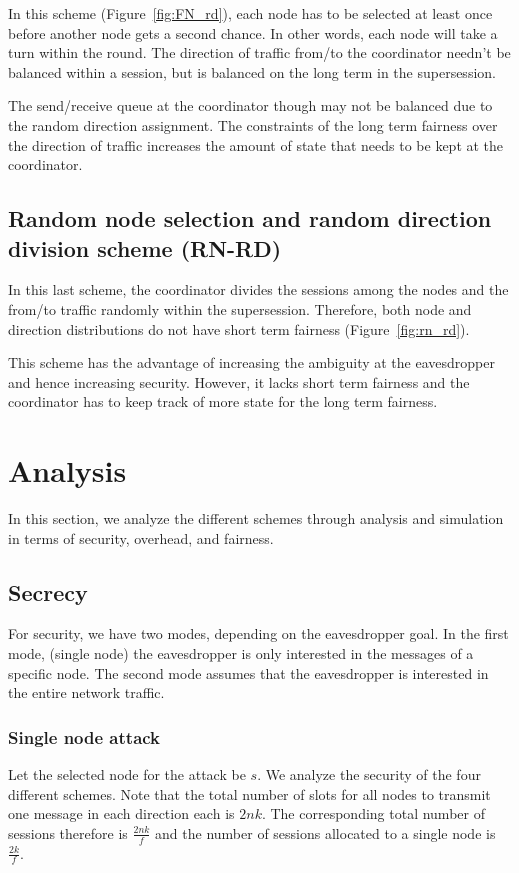 \documentclass[10pt,letterpaper,conference]{IEEEtran}
\begin{document}
In this scheme (Figure~\ref{fig:FN_rd}), each node has to be selected at least once before another node
gets a second chance. In other words, each node will take a turn within the
round. The direction of traffic from/to the coordinator needn't be balanced
within a session, but is balanced on the long term in the supersession.

The send/receive queue at the coordinator though may not be balanced due to the random
direction assignment. The constraints of the long term fairness over the
direction of traffic increases the amount of state that needs to be kept at the
coordinator.

\subsection{Random node selection and random direction division scheme (RN-RD)}
In this last scheme, the coordinator divides the sessions among the nodes and the from/to traffic randomly
within the supersession. Therefore, both node and direction distributions do
not have short term fairness (Figure~\ref{fig:rn_rd}).

This scheme has the advantage of increasing the ambiguity at the
eavesdropper and hence increasing security. However, it lacks short term
fairness and the coordinator has to keep track of more state for the long term
fairness.

\section{Analysis}
\label{sec:analysis}
In this section, we analyze the different schemes through analysis and
simulation in terms of security, overhead, and fairness.
\subsection{Secrecy}

For security, we have two modes, depending on the eavesdropper goal. In the
first mode, (single node) the eavesdropper is only interested in the messages of
a specific node. The second mode assumes that the eavesdropper is interested in
the entire network traffic.

\subsubsection{Single node attack}
Let the selected node for the attack be $s$. We analyze the security of the four
different schemes. Note that the total number of slots for all nodes to transmit
one message in each direction each is $2nk$. The corresponding total number of sessions therefore
is $\frac{2nk}{f}$ and the number of sessions allocated to a single node is
$\frac{2k}{f}$.
\end{document}
